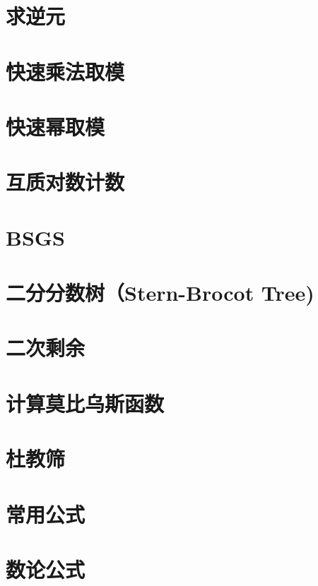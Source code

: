 \section{求逆元}
\raggedbottom
\hrulefill
\section{快速乘法取模}
\raggedbottom
\hrulefill
\section{快速幂取模}
\raggedbottom
\hrulefill
\section{互质对数计数}
\raggedbottom
\hrulefill
\section{BSGS}
\raggedbottom
\hrulefill
\section{二分分数树（Stern-Brocot Tree)}
\raggedbottom
\hrulefill
\section{	二次剩余}
\raggedbottom
\hrulefill
\section{计算莫比乌斯函数}
\raggedbottom
\hrulefill
\section{杜教筛}
\raggedbottom
\hrulefill
\section{常用公式}
\raggedbottom
\hrulefill
\section{数论公式}
\raggedbottom
\hrulefill

